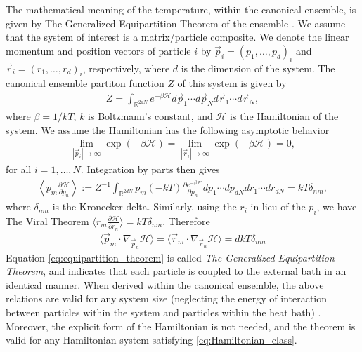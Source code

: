 \documentclass[english,12pt]{ttuthes}
\newcommand{\Hc}{\mathcal{H}}
\begin{document}
The mathematical meaning of the temperature, within the canonical
ensemble, is given by The Generalized Equipartition Theorem of the
ensemble \cite{Uline:JCP:124301}. We assume that the system of interest
is a matrix/particle composite. We denote the linear momentum and
position vectors of particle $i$ by $\vec{p}_i=(p_1,\ldots,p_d)_i$ and
$\vec{r}_i=(r_1,\ldots,r_d)_i$, respectively, where $d$ is the dimension of
the system. The canonical ensemble partiton function $Z$ of this system
is given by \cite{Uline:JCP:124301} 
%
\begin{align}
  Z=\int_{\mathbb{R}^{2dN}}e^{-\beta\Hc}d\vec{p}_1\cdots d\vec{p}_Nd\vec{r}_1\cdots d\vec{r}_N,
\end{align}
%
where $\beta=1/kT$, $k$ is Boltzmann's constant, and $\Hc$ is the 
Hamiltonian of the system. We assume the Hamiltonian has the following
asymptotic behavior
%
\begin{align}\label{eq:Hamiltonian_class}
  \lim_{|\vec{p}_i|\to\infty}\exp(-\beta\Hc)=
  \lim_{|\vec{r}_i|\to\infty}\exp(-\beta\Hc)=0,
\end{align}
%
for all $i=1,\ldots,N$. Integration by parts then gives \cite{Uline:JCP:124301}
%
\begin{align}
  \left\langle p_m\frac{\partial\Hc}{\partial p_n}\right\rangle:=
   Z^{-1}\int_{\mathbb{R}^{2dN}}p_m (-kT)\frac{\partial e^{-\beta\Hc}}{\partial p_n}dp_1\cdots dp_{dN}dr_1\cdots dr_{dN}=kT\delta_{nm},
\end{align}
%
where $\delta_{nm}$ is the Kronecker delta. Similarly, using the $r_i$ in lieu
of the $p_i$, we have The Viral Theorem
$\langle r_m\frac{\partial\Hc}{\partial r_n}\rangle=kT\delta_{nm}$. Therefore  
%
\begin{align}\label{eq:equipartition_theorem}
  \langle\vec{p}_m\cdot\nabla_{\vec{p}_n}\Hc\rangle=\langle\vec{r}_m\cdot\nabla_{\vec{r}_n}\Hc\rangle=dkT\delta_{nm}
\end{align}
%
Equation \eqref{eq:equipartition_theorem} is called \emph{The
  Generalized Equipartition Theorem}, and indicates that each particle
is coupled to the external bath in an identical manner. When derived
within the canonical ensemble, the above relations are valid for any
system size (neglecting the energy of interaction between particles
within the system and particles within the heat bath)
\cite{Uline:JCP:124301}. Moreover, the explicit form of the
Hamiltonian is not needed, and the theorem is valid for any
Hamiltonian system satisfying \eqref{eq:Hamiltonian_class}. 
\end{document}

